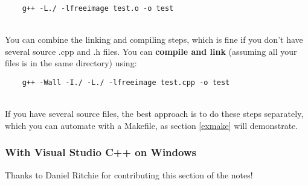 \documentclass[]{article}
\begin{document}
\begin{verbatim}
    g++ -L./ -lfreeimage test.o -o test
\end{verbatim}
\\
You can combine the linking and compiling steps, which is fine if you don't have several source .cpp and .h files. You can \textbf{compile and link} (assuming all your files is in the same directory) using:

\begin{verbatim}
    g++ -Wall -I./ -L./ -lfreeimage test.cpp -o test
\end{verbatim}
\\
If you have several source files, the best approach is to do these steps separately, which you can automate with a Makefile, as section \ref{exmake} will demonstrate.

\subsubsection{With Visual Studio C++ on Windows}\label{windows}
Thanks to Daniel Ritchie for contributing this section of the notes!
\end{document}
